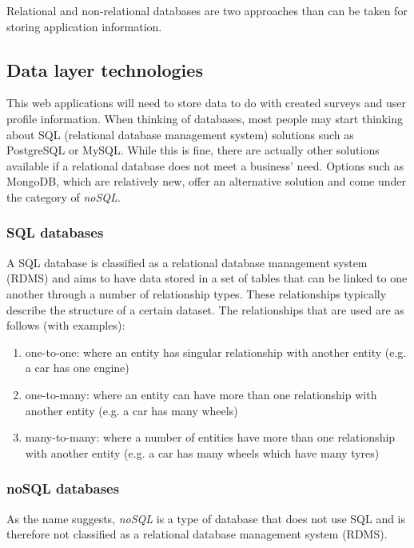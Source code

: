Relational and non-relational databases are two approaches than can be taken for storing application information.


\subsection{Data layer technologies}
This web applications will need to store data to do with created surveys and user profile information.
When thinking of databases, most people may start thinking about SQL (relational database management system) solutions such 
as PostgreSQL or MySQL.
While this is fine, there are actually other solutions available if a relational database does not meet a business' need. 
Options such as MongoDB, which are relatively new, offer an alternative solution and come under the category of \textit{noSQL}. 

\subsubsection*{SQL databases}
A SQL database is classified as a relational database management system (RDMS) and aims to have data stored in a set of tables that
can be linked to one another through a number of relationship types. These relationships typically describe the structure of a certain dataset.
The relationships that are used are as follows (with examples): 

\begin{enumerate}
    \item one-to-one: where an entity has singular relationship with another entity (e.g. a car has one engine)
    \item one-to-many: where an entity can have more than one relationship with another entity (e.g. a car has many wheels)
    \item many-to-many: where a number of entities have more than one relationship with another entity (e.g. a car has many wheels which have many tyres)
\end{enumerate}

\subsubsection*{noSQL databases}
As the name suggests, \textit{noSQL} is a type of database that does not use SQL and is therefore not classified as a relational database
management system (RDMS).



